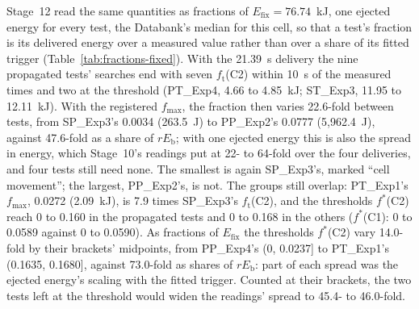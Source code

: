 \documentclass[preprint,12pt]{elsarticle}
\newcommand{\fs}{f^{*}}
\newcommand{\ft}{f_{\mathrm{t}}}
\newcommand{\fmax}{f_{\mathrm{max}}}
\newcommand{\Eb}{E_{\mathrm{b}}}
\begin{document}
Stage~12 read the same quantities as fractions of $E_{\mathrm{fix}}=76.74$~kJ, one ejected energy for every test, the Databank's median for this cell, so that a test's fraction is its delivered energy over a measured value rather than over a share of its fitted trigger (Table~\ref{tab:fractions-fixed}). With the 21.39~s delivery the nine propagated tests' searches end with seven $\ft$(C2) within 10~s of the measured times and two at the threshold (PT\_Exp4, 4.66 to 4.85~kJ; ST\_Exp3, 11.95 to 12.11~kJ). With the registered $\fmax$, the fraction then varies 22.6-fold between tests, from SP\_Exp3's 0.0034 (263.5~J) to PP\_Exp2's 0.0777 (5,962.4~J), against 47.6-fold as a share of $r\Eb$; with one ejected energy this is also the spread in energy, which Stage~10's readings put at 22- to 64-fold over the four deliveries, and four tests still need none. The smallest is again SP\_Exp3's, marked ``cell movement''; the largest, PP\_Exp2's, is not. The groups still overlap: PT\_Exp1's $\fmax$, 0.0272 (2.09~kJ), is 7.9 times SP\_Exp3's $\ft$(C2), and the thresholds $\fs$(C2) reach 0 to 0.160 in the propagated tests and 0 to 0.168 in the others ($\fs$(C1): 0 to 0.0589 against 0 to 0.0590). As fractions of $E_{\mathrm{fix}}$ the thresholds $\fs$(C2) vary 14.0-fold by their brackets' midpoints, from PP\_Exp4's (0, 0.0237] to PT\_Exp1's (0.1635, 0.1680], against 73.0-fold as shares of $r\Eb$: part of each spread was the ejected energy's scaling with the fitted trigger. Counted at their brackets, the two tests left at the threshold would widen the readings' spread to 45.4- to 46.0-fold.
\end{document}
